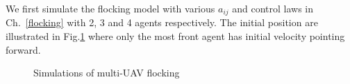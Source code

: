 We first simulate the flocking model with various $a_{ij}$ and control laws in Ch.~\ref{flocking} with 2, 3 and 4 agents respectively. The initial position are illustrated in Fig.\ref{fig:simulate_flocking} where only the most front agent has initial velocity pointing forward.
\begin{figure}[htb]
  \centering
  \quad
  \caption{Simulations of multi-UAV flocking}\label{fig:simulate_flocking}
\end{figure}
